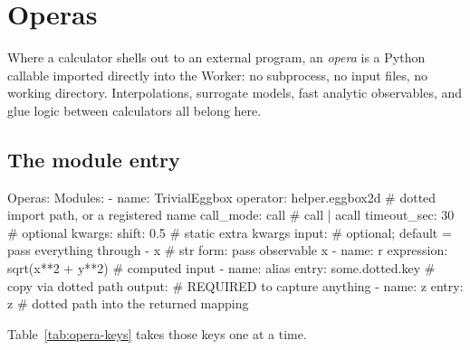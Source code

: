 \chapter{Operas}
\label{ch:operas}

 Where a calculator shells out to an
external program, an \emph{opera} is a Python callable imported directly into the Worker:
no subprocess, no input files, no working directory. Interpolations, surrogate models,
fast analytic observables, and glue logic between calculators all belong here.

\section{The module entry}
\label{sec:opera-entry}

\begin{yamlwin}
Operas:
  Modules:
    - name: TrivialEggbox
      operator: helper.eggbox2d      # dotted import path, or a registered name
      call_mode: call                # call | acall
      timeout_sec: 30                # optional
      kwargs: {shift: 0.5}           # static extra kwargs
      input:                         # optional; default = pass everything through
        - x                          # str form: pass observable x
        - name: r
          expression: sqrt(x**2 + y**2)   # computed input
        - name: alias
          entry: some.dotted.key     # copy via dotted path
      output:                        # REQUIRED to capture anything
        - name: z
          entry: z                   # dotted path into the returned mapping
\end{yamlwin}

Table~\ref{tab:opera-keys} takes those keys one at a time.

